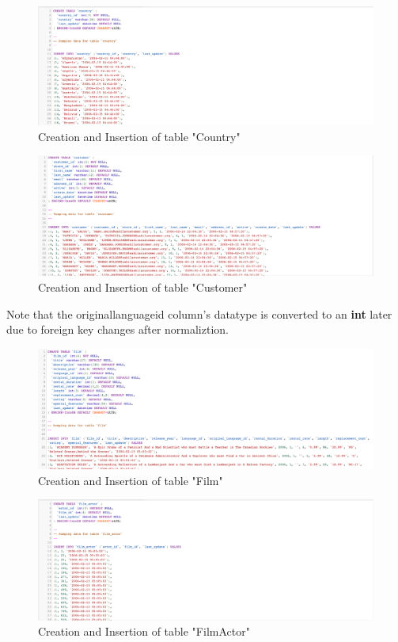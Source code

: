 \documentclass[openany]{article}
\begin{document}
	\begin{figure}[H]
		\includegraphics[width=\textwidth]{table_country_cins}
		\caption{Creation and Insertion of table "Country"}	
	\end{figure}
	\begin{figure}[H]
		\includegraphics[width=\textwidth]{table_customer_cins}
		\caption{Creation and Insertion of table "Customer"}	
	\end{figure}
	Note that the original\textunderscore language\textunderscore id column's datatype is converted to an \textbf{int} later due to foreign key changes after normaliztion.
	\begin{figure}[H]
		\includegraphics[width=\textwidth]{table_film_cins}
		\caption{Creation and Insertion of table "Film"}	
	\end{figure}
	\begin{figure}[H]
		\includegraphics[width=\textwidth]{table_filmactor_cins}
		\caption{Creation and Insertion of table "Film\textunderscore Actor"}	
	\end{figure}
\end{document}
